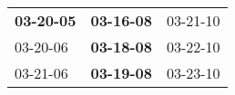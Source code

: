 \begin{supertabular}{p{0.33\columnwidth}p{0.33\columnwidth}p{0.33\columnwidth}}
 \textbf{03-20-05\textsuperscript{}} &  \textbf{03-16-08\textsuperscript{}} &  03-21-10\textsuperscript{} \\
          03-20-06\textsuperscript{} &  \textbf{03-18-08\textsuperscript{}} &  03-22-10\textsuperscript{} \\
          03-21-06\textsuperscript{} &  \textbf{03-19-08\textsuperscript{}} &  03-23-10\textsuperscript{} \\
\end{supertabular}
